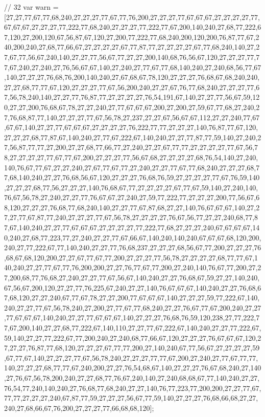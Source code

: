 // 32
var warn = [27,27,77,67,77,68,240,27,27,27,77,67,77,76,200,27,27,27,77,67,67,67,27,27,27,27,77,67,67,67,27,27,27,77,222,77,68,240,27,27,27,77,222,77,67,200,140,240,27,68,77,222,67,120,27,200,120,67,56,87,67,120,27,200,77,222,77,68,240,200,120,200,76,87,77,67,240,200,240,27,68,77,66,67,27,27,27,27,67,77,87,77,27,27,27,27,67,77,68,240,140,27,27,67,77,56,67,240,140,27,27,77,56,67,77,27,27,200,140,68,76,56,67,120,27,27,27,77,77,67,240,27,240,27,76,56,67,67,140,27,240,27,77,67,77,68,140,240,27,240,68,56,77,67,140,27,27,27,76,68,76,200,140,240,27,67,68,67,78,120,27,27,27,76,68,67,68,240,240,27,27,68,77,77,67,120,27,27,27,77,67,56,200,240,27,27,67,76,77,68,240,27,27,27,77,67,56,78,240,140,27,27,77,76,87,77,27,27,27,27,76,54,191,67,140,27,27,77,56,67,59,120,27,27,200,76,68,67,78,27,27,240,27,77,67,67,67,200,27,200,27,59,67,77,68,27,240,27,76,68,87,77,140,27,27,27,77,67,56,78,27,237,27,27,67,56,67,67,112,27,27,240,77,67,67,67,140,27,27,77,67,67,67,27,27,27,27,76,222,77,77,27,27,27,140,76,87,77,67,120,27,27,27,68,77,87,67,140,240,27,77,67,222,67,140,240,27,27,77,87,77,59,140,27,240,27,56,87,77,77,27,200,27,27,68,77,66,77,27,240,27,27,67,77,77,27,27,27,27,77,67,56,78,27,27,27,27,77,67,77,67,200,27,27,27,77,56,67,68,27,27,27,27,68,76,54,140,27,240,140,76,67,77,67,27,27,240,27,67,77,67,77,27,240,27,27,77,67,77,68,240,27,27,27,68,77,68,140,240,27,27,76,68,56,67,120,27,27,27,76,68,76,59,27,27,27,27,77,67,76,59,140,27,27,27,68,77,56,27,27,27,140,76,68,67,77,27,27,27,27,67,77,67,59,140,27,240,140,76,67,56,78,27,240,27,27,77,76,67,67,27,240,27,59,77,222,77,27,27,27,200,77,56,67,68,120,27,27,27,76,68,77,68,240,140,27,27,77,67,87,68,27,27,140,76,67,67,67,140,27,27,27,77,67,87,77,240,27,27,27,77,67,56,78,27,27,27,27,76,67,56,77,27,27,240,68,77,87,67,140,240,27,27,77,67,67,67,27,27,27,27,77,222,77,68,27,27,27,240,67,67,67,67,140,240,27,68,77,223,77,27,240,27,27,77,67,66,67,140,240,140,240,67,67,67,68,120,200,240,27,77,222,67,77,140,240,27,27,77,76,68,237,27,27,27,68,56,67,77,200,27,27,27,76,68,67,68,120,200,27,27,67,77,67,77,200,27,27,27,77,56,78,27,27,27,27,68,77,77,67,140,240,27,27,77,67,77,76,200,200,27,27,76,77,67,77,200,27,240,140,76,67,77,200,27,27,200,68,77,76,68,27,240,27,27,77,67,56,67,140,240,27,27,76,68,67,59,27,27,140,240,67,56,67,200,120,27,27,77,76,225,67,240,27,27,140,76,67,67,67,140,240,27,27,76,68,67,68,120,27,27,240,67,77,67,78,27,27,200,77,67,67,67,140,27,27,27,59,77,222,67,140,240,27,27,77,67,56,78,240,27,200,27,77,67,77,68,240,27,27,76,67,77,67,200,240,27,27,77,67,67,67,140,240,27,27,77,67,67,67,140,27,27,27,76,68,76,59,120,238,27,77,222,77,67,200,140,27,27,68,77,222,67,140,110,27,27,77,67,222,67,140,240,27,27,77,222,67,59,140,27,27,77,222,67,77,200,240,27,240,68,77,66,67,120,27,27,27,76,67,67,67,120,27,27,27,76,87,77,68,120,27,27,27,67,77,77,200,27,140,240,67,77,56,67,27,27,27,27,59,67,77,67,140,27,27,27,77,67,56,78,240,27,27,27,77,77,67,200,27,240,27,77,67,77,77,140,27,27,27,68,77,77,67,240,200,27,27,76,54,68,67,140,27,27,27,76,67,68,240,27,140,27,76,67,56,78,200,240,27,27,68,77,76,67,240,140,27,240,68,68,67,77,140,240,27,27,76,54,77,240,140,240,27,76,68,77,68,240,27,27,140,76,77,223,77,200,200,27,27,77,67,77,77,27,27,27,240,67,87,77,59,27,27,27,56,67,77,59,140,27,27,27,76,68,66,68,27,27,240,27,68,66,67,76,200,27,27,27,77,66,68,68,120];


